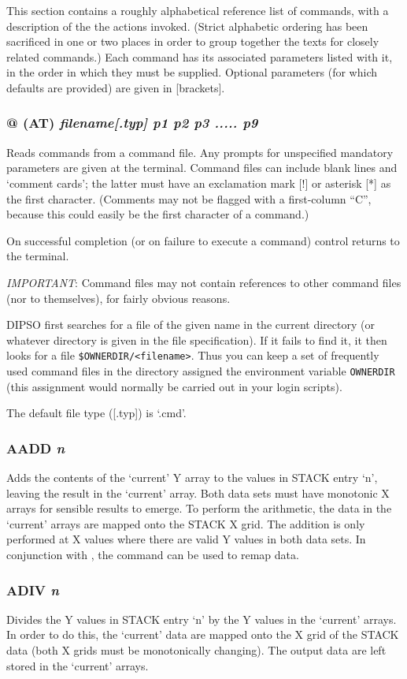 \documentclass[twoside,11pt,noabs,nolof]{starlink}
\providecommand{\dipcom}[3]{\subsubsection*{\label{COM:#1}\textbf{#1} \emph{#2}}}
\begin{document}
This section contains a roughly alphabetical reference list of commands,
with a description of the the actions invoked.
(Strict alphabetic ordering has been sacrificed in one or two places in
order to group together the texts for closely related commands.) Each
command has its associated parameters listed with it, in the order in
which they must be supplied. Optional parameters (for which defaults are
provided) are given in [brackets].

\dipcom{@ (AT)}{filename[.typ] p1 p2 p3 ..... p9}{Reads commands from a command file}
Reads commands from a command file. Any
prompts for unspecified mandatory parameters are given at the
terminal. Command files can include blank lines and `comment cards';
the latter must have an exclamation mark [!] or asterisk [*] as the
first character. (Comments may not be flagged with a first-column
``C'', because this could easily be the first character of a command.)

On successful completion (or on failure to execute a command) control
returns to the terminal.

\emph{IMPORTANT}: Command files may not contain references to other
command files (nor to themselves), for fairly obvious reasons.

DIPSO first searches for a file of the given name in the current directory (or
whatever directory is given in the file specification). If it fails to find it,
it then looks for a file {\verb+$OWNERDIR/<filename>+}. Thus you can keep a set
of frequently used command files in the directory assigned the environment
variable {\texttt{OWNERDIR}}  (this assignment would normally be carried
out in your login scripts).

The default file type ([.typ]) is `.cmd'.

\dipcom{AADD}{n}{Adds the Y values in two arrays}
Adds the contents of the `current' Y array to the values in STACK
entry `n', leaving the result in the `current' array. Both data sets
must have monotonic X arrays for sensible results to emerge. To
perform the arithmetic, the data in the `current' arrays are mapped
onto the STACK X grid. The addition is only performed at X values
where there are valid Y values in both data sets. In conjunction with
,  the   command can be used to remap data.

\dipcom{ADIV}{n}{Divides the Y values in two arrays}
Divides the Y values in STACK entry `n' by the Y values in the
`current' arrays. In order to do this, the `current' data are mapped
onto the X grid of the STACK data (both X grids must be monotonically
changing). The output data are left stored in the `current' arrays.
\end{document}
